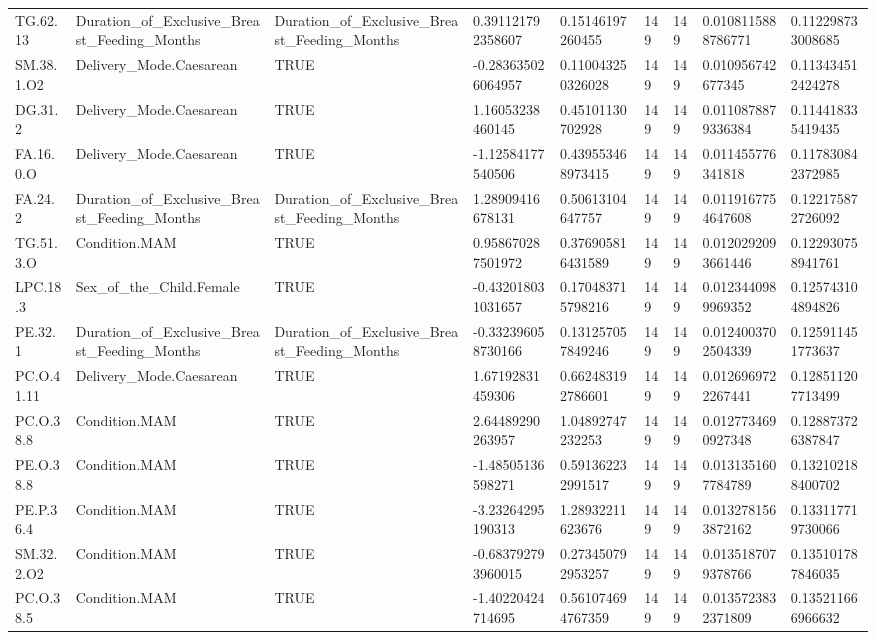\begin{longtable}{lllllllll}
TG.62.13 & Duration\_of\_Exclusive\_Breast\_Feeding\_Months & Duration\_of\_Exclusive\_Breast\_Feeding\_Months & 0.391121792358607 & 0.15146197260455 & 149 & 149 & 0.0108115888786771 & 0.112298733008685 \\
SM.38.1.O2 & Delivery\_Mode.Caesarean & TRUE & -0.283635026064957 & 0.110043250326028 & 149 & 149 & 0.010956742677345 & 0.113434512424278 \\
DG.31.2 & Delivery\_Mode.Caesarean & TRUE & 1.16053238460145 & 0.45101130702928 & 149 & 149 & 0.0110878879336384 & 0.114418335419435 \\
FA.16.0.O & Delivery\_Mode.Caesarean & TRUE & -1.12584177540506 & 0.439553468973415 & 149 & 149 & 0.011455776341818 & 0.117830842372985 \\
FA.24.2 & Duration\_of\_Exclusive\_Breast\_Feeding\_Months & Duration\_of\_Exclusive\_Breast\_Feeding\_Months & 1.28909416678131 & 0.50613104647757 & 149 & 149 & 0.0119167754647608 & 0.122175872726092 \\
TG.51.3.O & Condition.MAM & TRUE & 0.958670287501972 & 0.376905816431589 & 149 & 149 & 0.0120292093661446 & 0.122930758941761 \\
LPC.18.3 & Sex\_of\_the\_Child.Female & TRUE & -0.432018031031657 & 0.170483715798216 & 149 & 149 & 0.0123440989969352 & 0.125743104894826 \\
PE.32.1 & Duration\_of\_Exclusive\_Breast\_Feeding\_Months & Duration\_of\_Exclusive\_Breast\_Feeding\_Months & -0.332396058730166 & 0.131257057849246 & 149 & 149 & 0.0124003702504339 & 0.125911451773637 \\
PC.O.41.11 & Delivery\_Mode.Caesarean & TRUE & 1.67192831459306 & 0.662483192786601 & 149 & 149 & 0.0126969722267441 & 0.128511207713499 \\
PC.O.38.8 & Condition.MAM & TRUE & 2.64489290263957 & 1.04892747232253 & 149 & 149 & 0.0127734690927348 & 0.128873726387847 \\
PE.O.38.8 & Condition.MAM & TRUE & -1.48505136598271 & 0.591362232991517 & 149 & 149 & 0.0131351607784789 & 0.132102188400702 \\
PE.P.36.4 & Condition.MAM & TRUE & -3.23264295190313 & 1.28932211623676 & 149 & 149 & 0.0132781563872162 & 0.133117719730066 \\
SM.32.2.O2 & Condition.MAM & TRUE & -0.683792793960015 & 0.273450792953257 & 149 & 149 & 0.0135187079378766 & 0.135101787846035 \\
PC.O.38.5 & Condition.MAM & TRUE & -1.40220424714695 & 0.561074694767359 & 149 & 149 & 0.0135723832371809 & 0.135211666966632 \\

\end{longtable}
